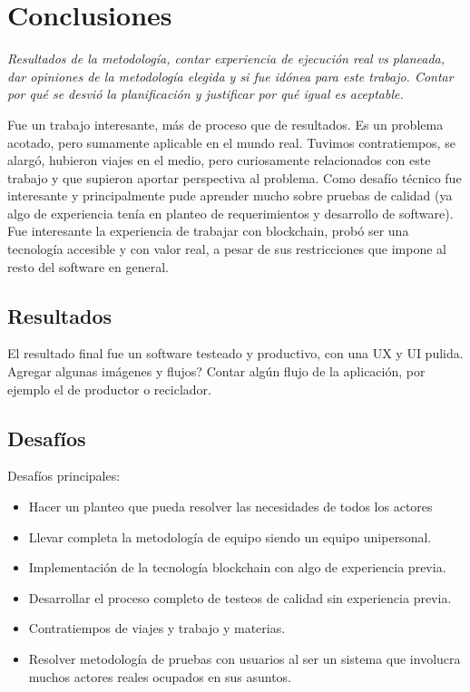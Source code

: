\chapter[Conclusiones ]{Conclusiones}
\label{cp:Conclusions}


\parindent0pt

\textit{Resultados de la metodología, contar experiencia de ejecución real vs planeada, dar opiniones de la metodología elegida y si fue idónea para este trabajo. Contar por qué se desvió la planificación y justificar por qué igual es aceptable.}

Fue un trabajo interesante, más de proceso que de resultados. Es un problema acotado, pero sumamente aplicable en el mundo real. Tuvimos contratiempos, se alargó, hubieron viajes en el medio, pero curiosamente relacionados con este trabajo y que supieron aportar perspectiva al problema. Como desafío técnico fue interesante y principalmente pude aprender mucho sobre pruebas de calidad (ya algo de experiencia tenía en planteo de requerimientos y desarrollo de software). Fue interesante la experiencia de trabajar con blockchain, probó ser una tecnología accesible y con valor real, a pesar de sus restricciones que impone al resto del software en general.

\section{Resultados}

El resultado final fue un software testeado y productivo, con una UX y UI pulida. Agregar algunas imágenes y flujos?
Contar algún flujo de la aplicación, por ejemplo el de productor o reciclador.

\section{Desafíos}

Desafíos principales:
\begin{itemize}
	\item Hacer un planteo que pueda resolver las necesidades de todos los actores
	\item Llevar completa la metodología de equipo siendo un equipo unipersonal.
	\item Implementación de la tecnología blockchain con algo de experiencia previa.
	\item Desarrollar el proceso completo de testeos de calidad sin experiencia previa.
	\item Contratiempos de viajes y trabajo y materias.
	\item Resolver metodología de pruebas con usuarios al ser un sistema que involucra muchos actores reales ocupados en sus asuntos.
\end{itemize}


